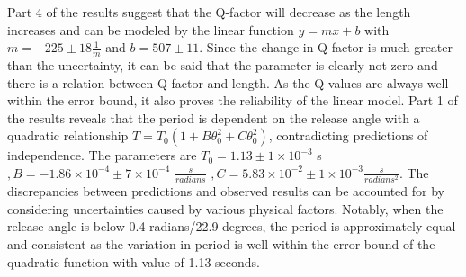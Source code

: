 \documentclass{article}
\begin{document}
Part 4 of the results suggest that the Q-factor will decrease as the length increases and can be modeled by the linear function $y = mx + b$ with $m = -225 \pm 18\frac{1}{m}$ and $b = 507 \pm 11$. Since the change in Q-factor is much greater than the uncertainty, it can be said that the parameter is clearly not zero and there is a relation between Q-factor and length. As the Q-values are always well within the error bound, it also proves the reliability of the linear model.
Part 1 of the results reveals that the period is dependent on the release angle with a quadratic relationship $T = T_0(1 + B\theta_0^2 + C\theta_0^2)$, contradicting predictions of independence. The parameters are $T_0 = 1.13  \pm 1\times10^{-3} $ s $, B = -1.86\times10^{-4}  \pm 7\times10^{-4}$ $\frac{s}{radians}$ $, C = 5.83\times10^{-2} \pm 1\times10^{-3} \frac{s}{radians^2}$. The discrepancies between predictions and observed results can be accounted for by considering uncertainties caused by various physical factors. Notably, when the release angle is below 0.4 radians/22.9 degrees, the period is approximately equal and consistent as the variation in period is well within the error bound of the quadratic function with value of 1.13 seconds.
\end{document}
